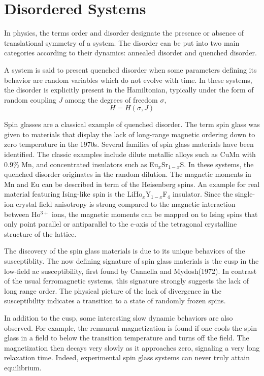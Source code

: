 \section{Disordered Systems}
In physics, the terms order and disorder designate the presence or absence of 
translational symmetry of a system. The disorder can be put into two main categories 
according to their dynamics: annealed disorder and quenched disorder.

A system is said to present quenched disorder when 
some parameters defining its behavior are random variables which do not evolve 
with time. In these systems, the disorder is explicitly present in the Hamiltonian, 
typically under the form of random coupling $J$ among the degrees of freedom $\sigma$,
\begin{equation}
  \label{eq:4}
  H=H(\sigma,J)
\end{equation}

Spin glasses are a classical example of quenched disorder. 
The term spin glass was given to materials that display the lack of long-range
magnetic ordering down to zero temperature in the 1970s. 
Several families of spin glass materials have been identified. The classic examples include 
dilute metallic alloys such as CuMn with 0.9\% Mn, and concentrated insulators 
such as Eu$_x$Sr$_{1-x}$S. In these systems, the quenched disorder originates in the random dilution.
The magnetic moments in Mn and Eu can be described in term of the Heisenberg spins.
An example for real material featuring Ising-like spin is the 
LiHo$_x$Y$_{1-x}$F$_4$ insulator. Since the single-ion crystal field anisotropy
is strong compared to the magnetic interaction between Ho$^{3+}$ ions, the magnetic 
moments can be mapped on to Ising spins that only point parallel or antiparallel
to the c-axis of the tetragonal crystalline structure of the lattice. 

The discovery of the spin glass materials is due to its unique behaviors of
the susceptiblity. The now defining signature of spin glass materials is 
the cusp in the low-field ac susceptibility, first found by Cannella and Mydosh(1972).
In contrast of the usual ferromagnetic systems, this signature strongly 
suggests the lack of long range order. The physical picture of the lack 
of divergence in the susceptibility indicates a transition to a state of randomly 
frozen spins. 

In addition to the cusp, some interesting slow dynamic 
behaviors are also observed. For example, the remanent magnetization is found 
if one cools the spin glass in a field to below the transition temperature and 
turns off the field. The magnetization then decays very slowly as it approaches 
zero, signaling a very long relaxation time. Indeed, experimental spin glass
systems can never truly attain equilibrium. 

